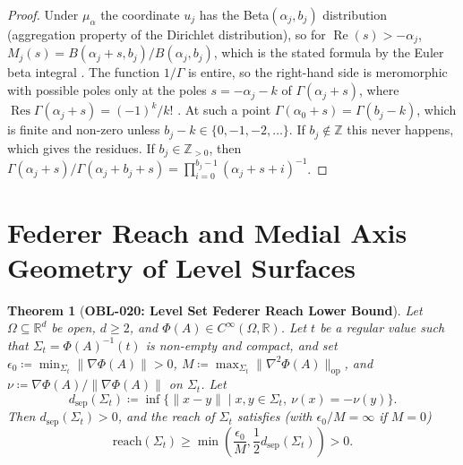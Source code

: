 \documentclass[11pt,a4paper,reqno]{amsart}
\newtheorem{theorem}{Theorem}[section]
\theoremstyle{definition}
\theoremstyle{remark}
\numberwithin{equation}{section}
\begin{document}
\begin{proof}
Under $\mu_\alpha$ the coordinate $u_j$ has the Beta$(\alpha_j, b_j)$ distribution (aggregation property of the Dirichlet distribution), so for $\operatorname{Re}(s) > -\alpha_j$,
$M_j(s) = B(\alpha_j + s, b_j)/B(\alpha_j, b_j)$, which is the stated formula by the Euler beta integral \cite[eq.~5.12.1]{DLMF}. The function $1/\Gamma$ is entire, so the right-hand side is meromorphic with possible poles only at the poles $s = -\alpha_j - k$ of $\Gamma(\alpha_j + s)$, where $\operatorname{Res}\Gamma(\alpha_j+s) = (-1)^k/k!$ \cite[\S5.2(i)]{DLMF}. At such a point $\Gamma(\alpha_0 + s) = \Gamma(b_j - k)$, which is finite and non-zero unless $b_j - k \in \{0, -1, -2, \dots\}$. If $b_j \notin \mathbb{Z}$ this never happens, which gives the residues. If $b_j \in \mathbb{Z}_{>0}$, then $\Gamma(\alpha_j+s)/\Gamma(\alpha_j+b_j+s) = \prod_{i=0}^{b_j-1}(\alpha_j+s+i)^{-1}$.
\end{proof}

\section{Federer Reach and Medial Axis Geometry of Level Surfaces}
\label{sec:federer}

\begin{theorem}[\textbf{OBL-020: Level Set Federer Reach Lower Bound}]
\label{thm:federer_reach_bound}
Let $\Omega \subseteq \mathbb{R}^d$ be open, $d \ge 2$, and $\Phi(A) \in C^\infty(\Omega, \mathbb{R})$. Let $t$ be a regular value such that $\Sigma_t = \Phi(A)^{-1}(t)$ is non-empty and compact, and set $\epsilon_0 \coloneqq \min_{\Sigma_t} \|\nabla \Phi(A)\| > 0$, $M \coloneqq \max_{\Sigma_t} \|\nabla^2 \Phi(A)\|_{\mathrm{op}}$, and $\nu \coloneqq \nabla\Phi(A)/\|\nabla\Phi(A)\|$ on $\Sigma_t$. Let
\begin{equation}
d_{\mathrm{sep}}(\Sigma_t) \coloneqq \inf \{ \|x - y\| \mid x, y \in \Sigma_t,\ \nu(x) = -\nu(y) \}.
\end{equation}
Then $d_{\mathrm{sep}}(\Sigma_t) > 0$, and the reach of $\Sigma_t$ satisfies (with $\epsilon_0/M = \infty$ if $M = 0$)
\begin{equation}
\mathrm{reach}(\Sigma_t) \ge \min\left( \frac{\epsilon_0}{M}, \frac{1}{2} d_{\mathrm{sep}}(\Sigma_t) \right) > 0.
\end{equation}
\end{theorem}
\end{document}
